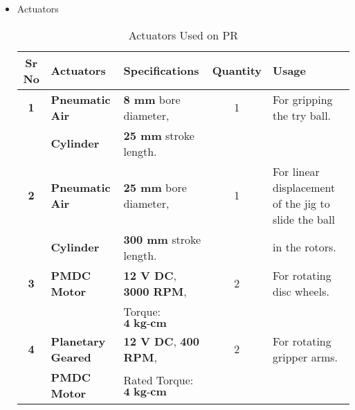\begin{itemize}
            \item Actuators
            \begin{table}[h]
                \caption {Actuators Used on PR} \label{Actuators_PR}  \small
                \begin{tabular}{|c|l|l|c|l|}
                    \hline  \hline
                    \textbf{Sr No}  & \textbf{Actuators}        & \textbf{Specifications}               & \textbf{Quantity}  & \textbf{Usage}                                               \\ \hline   \hline
                    \textbf{1}      & \textbf{Pneumatic Air}    & \textbf{8 mm} bore diameter,          & 1                  & For gripping the try ball.                                    \\
                                    & \textbf{Cylinder}         & \textbf{25 mm} stroke length.         &                    &                                                              \\ \hline
                    \textbf{2}      & \textbf{Pneumatic Air}    & \textbf{25 mm} bore diameter,         & 1                  & For linear displacement of the jig to slide the ball         \\
                                    & \textbf{Cylinder}         & \textbf{300 mm} stroke length.        &                    & in the rotors.                                                \\ \hline                                  
                    \textbf{3}      & \textbf{PMDC Motor}       & \textbf{12 V DC},  \textbf{3000 RPM}, & 2                  & For rotating disc wheels.                                     \\
                                    &                           & Torque: $\textbf{4 kg-cm}$            &                    &                                                              \\ \hline 
                    \textbf{4}      & \textbf{Planetary Geared} & \textbf{12 V DC},  \textbf{400 RPM},  & 2                  & For rotating gripper arms.                                    \\
                                    & \textbf{PMDC Motor}       & Rated Torque: $\textbf{4 kg-cm}$      &                    &                                                              \\ \hline   \hline   
                \end{tabular}
            \end{table}
        \end{itemize}


